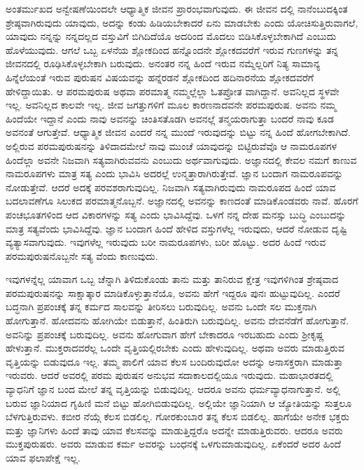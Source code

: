 ಅಂತರ್ಮುಖದ ಅನ್ವೇಷಣೆಯಿಂದಲೇ ಆಧ್ಯಾತ್ಮಿಕ ಜೀವನ ಪ್ರಾರಂಭವಾಗುವುದು. ಈ ಜೀವನ ದಲ್ಲಿ ನಾನೆಂಬುದಕ್ಕಿಂತ ಶ್ರೇಷ್ಠವಾಗಿರುವುದು ಯಾವುದು, ಅದನ್ನು ಕಂಡು ಹಿಡಿಯಬೇಕಾದರೆ ಏನು ಮಾಡಬೇಕು ಎಂದು ಯೋಚಿಸುತ್ತಿರುವಾಗಲೆ, ಯಾವುದು ನನ್ನನ್ನು ನನ್ನದಲ್ಲದ ವಸ್ತುವಿಗೆ ಬಿಗಿದಿದೆಯೊ ಅದರಿಂದ ಮೊದಲು ಬಿಡಿಸಿಕೊಳ್ಳಬೇಕಾಗಿದೆ ಎಂಬುದು ಹೊಳೆಯುವುದು. ಆಗಲೆ ಒಬ್ಬ ಏಳನೆಯ ಶ್ಲೋಕದಿಂದ ಹನ್ನೊಂದನೇ ಶ್ಲೋಕದವರೆಗೆ ಇರುವ ಗುಣಗಳನ್ನು ತನ್ನ ಜೀವನದಲ್ಲಿ ರೂಢಿಸಿಕೊಳ್ಳಬೇಕಾಗಿ ಬರುವುದು. ಅನಂತರ ನನ್ನ ಹಿಂದೆ ಇರುವ ನಮ್ಮೆಲ್ಲರಿಗೆ ನಿತ್ಯ ಸಾಮಾನ್ಯ ಹಿನ್ನೆಲೆಯಂತೆ ಇರುವ ಪುರುಷನ ವಿಷಯವನ್ನು ಹನ್ನೆರಡನೆ ಶ್ಲೋಕದಿಂದ ಹದಿನಾರನೆಯ ಶ್ಲೋಕದವರೆಗೆ ಹೇಳಿದ್ದಾಯಿತು. ಆ ಪರಮಪುರುಷ ಅಥವಾ ಪರಮಾತ್ಮ ನಮ್ಮಲ್ಲೆಲ್ಲಾ ಓತಪ್ರೋತ ವಾಗಿದ್ದಾನೆ. ಅವನಿಲ್ಲದ ಸ್ಥಳವೇ ಇಲ್ಲ. ಅವನಿಲ್ಲದ ಕಾಲವೇ ಇಲ್ಲ. ಜೀವ ಜಗತ್ತುಗಳಿಗೆ ಮೂಲ ಕಾರಣನಾದವನೇ ಪರಮಪುರುಷ. ಅವನು ನಮ್ಮ ಹಿಂದೆಯೇ ಇದ್ದಾನೆ ಎಂದು ನಾವು ಅವನನ್ನು ಚಿಂತಿಸತೊಡಗಿ ಅವನಲ್ಲೆ ತನ್ಮಯರಾಗುತ್ತಾ ಬಂದರೆ ನಾವು ಕೂಡ ಅವನಂತೆ ಆಗುತ್ತೇವೆ. ಆಧ್ಯಾತ್ಮಿಕ ಜೀವನ ಎಂದರೆ ನನ್ನ ಮುಂದೆ ಇರುವುದನ್ನು ಬಿಟ್ಟು ನನ್ನ ಹಿಂದೆ ಹೋಗಬೇಕಾಗಿದೆ. ಅಲ್ಲಿರುವ ಪರಮಪುರುಷನನ್ನು ತಿಳಿದಾದಮೇಲೆ ನಾವು ಮುಂಚೆ ಯಾವುದನ್ನು ಬಿಟ್ಟಿರುವೆವೊ ಆ ನಾಮರೂಪಗಳ ಹಿಂದೆಲ್ಲಾ ಅವನೇ ನಿಜವಾಗಿ ಸತ್ಯವಾಗಿರುವವನು ಎಂಬುದು ಅರ್ಥವಾಗುವುದು. ಅಜ್ಞಾನದಲ್ಲಿ ಕೇವಲ ನಮಗೆ ಕಾಣುವ ನಾಮರೂಪಗಳು ಮಾತ್ರ ಸತ್ಯ ಎಂದು ಭಾವಿಸಿ ಅದರಲ್ಲೆ ಉನ್ಮತ್ತಾರಾಗಿರುತ್ತೇವೆ. ಜ್ಞಾನ ಬಂದಾಗ ನಾಮರೂಪವನ್ನು ನೋಡುತ್ತೇವೆ. ಆದರೆ ಅದಕ್ಕೆ ಪರವಶರಾಗುವುದಿಲ್ಲ. ನಿಜವಾಗಿ ಸತ್ಯವಾಗಿರುವುದು ನಾಮರೂಪದ ಹಿಂದೆ ಯಾವ ಬದಲಾವಣೆಗೂ ಸಿಲುಕದ ಪರಮಾತ್ಮನೊಬ್ಬನೆ. ಅಜ್ಞಾನದಲ್ಲಿ ಅವನನ್ನು ಕಾಣದಂತೆ ಮಾಡಿಕೊಂಡವರು ನಾವೆ. ಹೊರಗೆ ಪಂಚಭೂತಗಳಿಂದ ಆದ ವಿಕಾರಗಳನ್ನು ಸತ್ಯ ಎಂದು ಭಾವಿಸಿದ್ದೆವು. ಒಳಗೆ ನನ್ನ ದೇಹ ಮನಸ್ಸು ಬುದ್ಧಿ ಎಂಬುದನ್ನು ಮಾತ್ರ ಸತ್ಯವೆಂದು ಭಾವಿಸಿದ್ದೆವು. ಜ್ಞಾನ ಬಂದಾಗ ಹಿಂದೆ ಹೇಳಿದ ವಸ್ತುಗಳೆಲ್ಲ ಇರುವುದು, ಆದರೆ ನೋಡುವ ದೃಷ್ಟಿ ವ್ಯತ್ಯಾಸವಾಗುವುದು. ಇವುಗಳೆಲ್ಲ ಇರುವುದು ಬರೀ ನಾಮರೂಪಗಳು, ಬರೀ ಹೊಟ್ಟು. ಅದರ ಹಿಂದೆ ಇರುವ ಪರಮಪುರುಷನೊಬ್ಬನೇ ಸತ್ಯ ವೆಂದು ಕಾಣುವುದು.

ಇವುಗಳನ್ನೆಲ್ಲ ಯಾವಾಗ ಒಬ್ಬ ಚೆನ್ನಾಗಿ ತಿಳಿದುಕೊಂಡು ತಾನು ಮತ್ತು ತಾನಿರುವ ಕ್ಷೇತ್ರ ಇವುಗಳಿಗಿಂತ ಶ್ರೇಷ್ಠವಾದ ಪರಮಪುರುಷನನ್ನು ಸಾಕ್ಷಾತ್ಕಾರ ಮಾಡಿಕೊಳ್ಳುತ್ತಾನೆಯೊ, ಅವನು ಹೇಗೆ ಇದ್ದರೂ ಪುನಃ ಹುಟ್ಟುವುದಿಲ್ಲ. ಎಂದರೆ ಬದ್ಧನಾಗಿ ಪ್ರಪಂಚಕ್ಕೆ ತನ್ನ ಕರ್ಮದ ಸಾಲವನ್ನು ತೀರಿಸಲು ಬರುವುದಿಲ್ಲ. ಅವನು ಒಂದೇ ಸಲ ಮುಕ್ತನಾಗಿ ಹೋಗುತ್ತಾನೆ. ಹೋದವನು ಹೋಗಿಯೇ ಬಿಡುತ್ತಾನೆ, ಹಿಂತಿರುಗಿ ಬರುವುದಿಲ್ಲ. ಅವನು ದೇವನೆಡೆಗೆ ಹೋಗುತ್ತಾನೆ. ಅವನಿನ್ನು ಪ್ರಪಂಚಕ್ಕೆ ಬರುವುದಿಲ್ಲ. ಅವನು ಹೋಗುವಾಗ ಹೇಗೆ ಬೇಕಾದರೂ ಇರಬಹುದು ಎಂದು ಶ್ರೀಕೃಷ್ಣ ಹೇಳುತ್ತಾನೆ. ಮುಕ್ತರಾದವರೆಲ್ಲ ಒಂದೇ ವೃತ್ತಿಯಲ್ಲಿರಬೇಕು ಎಂದು ಹೇಳುವುದಿಲ್ಲ. ಅಥವಾ ಅವರು ಮಾಡುತ್ತಿರುವ ವೃತ್ತಿಯನ್ನು ಬಿಡುವುದೂ ಇಲ್ಲ. ತಮ್ಮ ಪಾಲಿಗೆ ಯಾವ ಕೆಲಸ ಬಂದಿರುವುದೋ ಅದನ್ನು ಅನಾಸಕ್ತರಾಗಿ ಮಾಡುತ್ತಾ ಇರುವರು. ಆದರೆ ಅವರಲ್ಲಿ ಪರಮ ಪುರುಷನ ಅನುಭವ ಸದಾಕಾಲದಲ್ಲಿಯೂ ಇರುವುದು. ಮಹಾಭಾರತದಲ್ಲಿ ವ್ಯಾಧನಿಗೆ ಜ್ಞಾನ ಬಂದ ಮೇಲೆ ತನ್ನ ವೃತ್ತಿಯನ್ನು ಬಿಡುವುದಿಲ್ಲ. ಆದರೂ ಅವನು ಧರ್ಮವ್ಯಾಧನಾಗುತ್ತಾನೆ. ಅಲ್ಲಿ ಬರುವ ಜ್ಞಾನಿಯಾದ ಗೃಹಿಣಿ ಮನೆ ಬಿಟ್ಟು ಹೋಗಿಬಿಡುವುದಿಲ್ಲ. ಅಲ್ಲಿಯೇ ಜ್ಞಾನಿಯಾಗಿ ಆ ಜ್ಯೋತಿಯನ್ನು ಸುತ್ತಲೂ ಬೆಳಗುತ್ತಿರುವಳು. ಕಬೀರ ನೆಯ್ಗೆ ಕೆಲಸ ಬಿಡಲಿಲ್ಲ. ಗೋರಕುಂಬಾರ ತನ್ನ ಕೆಲಸ ಬಿಡಲಿಲ್ಲ. ಹಾಗೆಯೇ ಅನೇಕ ಭಕ್ತರು ಮತ್ತು ಜ್ಞಾನಿಗಳು ಹಿಂದೆ ತಾವು ಯಾವ ಕೆಲಸವನ್ನು ಮಾಡುತ್ತಿದ್ದರೊ ಅದನ್ನೇ ಮಾಡುತ್ತಿರುವರು. ಆದರೂ ಅವರು ಮುಕ್ತಪುರುಷರು. ಅವರು ಮಾಡುವ ಕರ್ಮ ಅವರನ್ನು ಬಂಧನಕ್ಕೆ ಒಳಗುಮಾಡುವುದಿಲ್ಲ. ಏಕೆಂದರೆ ಅದರ ಹಿಂದೆ ಯಾವ ಫಲಾಪೇಕ್ಷೆ ಇಲ್ಲ.

